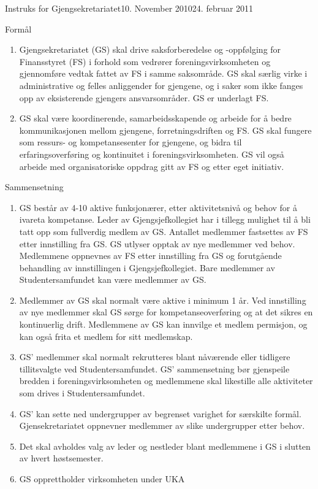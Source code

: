 \begin{instruks}{Instruks for Gjengsekretariatet}{10. November 2010}{24. februar 2011}

    \begin{instruksledd}{Formål}
        \begin{enumerate}
            \item Gjengsekretariatet (GS) skal drive saksforberedelse og -oppfølging for Finansstyret (FS) i forhold som vedrører
foreningsvirksomheten og gjennomføre vedtak fattet av FS i samme saksområde. GS
skal særlig virke i administrative og felles anliggender for gjengene, og i saker som ikke fanges opp av
eksisterende gjengers ansvarsområder. GS er underlagt FS.
            \item  GS skal være koordinerende, samarbeidsskapende og arbeide for å bedre kommunikasjonen
mellom gjengene, forretningsdriften og FS. GS skal fungere som ressurs- og
kompetansesenter for gjengene, og bidra til erfaringsoverføring og kontinuitet i foreningsvirksomheten.
GS vil også arbeide med organisatoriske oppdrag gitt av FS og etter eget initiativ.
        \end{enumerate}
    \end{instruksledd}

    \begin{instruksledd}{Sammensetning}
        \begin{enumerate}
            \item GS består av 4-10 aktive funksjonærer, etter aktivitetsnivå og behov for å ivareta kompetanse. Leder av Gjengsjefkollegiet har i tillegg mulighet til å bli tatt opp som fullverdig medlem av GS.  
Antallet medlemmer fastsettes av FS etter innstilling fra GS. GS
utlyser opptak av nye medlemmer ved behov. Medlemmene oppnevnes av FS etter innstilling fra
GS og forutgående behandling av innstillingen i Gjengsjefkollegiet. Bare medlemmer av
Studentersamfundet kan være medlemmer av GS.
            \item Medlemmer av GS skal normalt være aktive i minimum 1 år. Ved innstilling av nye
medlemmer skal GS sørge for kompetanseoverføring og at det sikres en kontinuerlig drift.
Medlemmene av GS kan innvilge et medlem permisjon, og kan også frita et medlem for sitt
medlemskap.
            \item  GS' medlemmer skal normalt rekrutteres blant nåværende eller tidligere tillitsvalgte ved
Studentersamfundet. GS' sammensetning bør gjenspeile bredden i foreningsvirksomheten og
medlemmene skal likestille alle aktiviteter som drives i Studentersamfundet.
            \item GS' kan sette ned undergrupper av begrenset varighet for særskilte formål. Gjensekretariatet
oppnevner medlemmer av slike undergrupper etter behov.
        \item Det skal avholdes valg av leder og nestleder blant medlemmene i GS i slutten av hvert høstsemester.
            \item GS opprettholder virksomheten under UKA
        \end{enumerate}
    \end{instruksledd}


\end{instruks}
